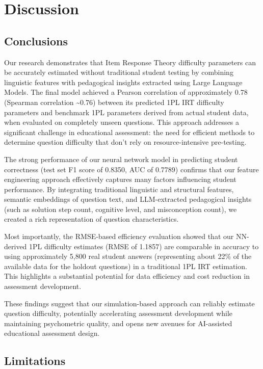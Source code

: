 \documentclass[
    a4paper, %
    10pt, %
    twoside, %
]{LTJournalArticle}
\begin{document}
\section{Discussion}

\subsection{Conclusions}

Our research demonstrates that Item Response Theory difficulty parameters can be accurately estimated without traditional student testing by combining linguistic features with pedagogical insights extracted using Large Language Models. The final model achieved a Pearson correlation of approximately 0.78 (Spearman correlation \textasciitilde0.76) between its predicted 1PL IRT difficulty parameters and benchmark 1PL parameters derived from actual student data, when evaluated on completely unseen questions. This approach addresses a significant challenge in educational assessment: the need for efficient methods to determine question difficulty that don't rely on resource-intensive pre-testing.

The strong performance of our neural network model in predicting student correctness (test set F1 score of 0.8350, AUC of 0.7789) confirms that our feature engineering approach effectively captures many factors influencing student performance. By integrating traditional linguistic and structural features, semantic embeddings of question text, and LLM-extracted pedagogical insights (such as solution step count, cognitive level, and misconception count), we created a rich representation of question characteristics.

Most importantly, the RMSE-based efficiency evaluation showed that our NN-derived 1PL difficulty estimates (RMSE of 1.1857) are comparable in accuracy to using approximately 5,800 real student answers (representing about 22\% of the available data for the holdout questions) in a traditional 1PL IRT estimation. This highlights a substantial potential for data efficiency and cost reduction in assessment development.

These findings suggest that our simulation-based approach can reliably estimate question difficulty, potentially accelerating assessment development while maintaining psychometric quality, and opens new avenues for AI-assisted educational assessment design.

\subsection{Limitations}
\end{document}
